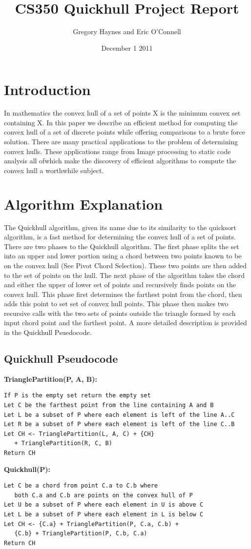 \documentclass[11pt]{article}
\title{CS350 Quickhull Project Report}
\author{Gregory Haynes and Eric O'Connell}
\date{December 1 2011}
\begin{document}
\maketitle

\section{Introduction}

In mathematics the convex hull of a set of points X is the minimum convex set containing X\cite{Wikipedia:QH}. In this paper we describe an efficient method for computing the convex hull of a set of discrete points while offering comparisons to a brute force solution. There are many practical applications to the problem of determining convex hulls. These applications range from Image processing to static code analysis all ofwhich make the discovery of efficient algorithms to compute the convex hull a worthwhile subject.

\section{Algorithm Explanation}

The Quickhull algorithm, given its name due to its similarity to the quicksort algorithm, is a fast method for determining the convex hull of a set of points. There are two phases to the Quickhull algorithm. The first phase splits the set into an upper and lower portion using a chord between two points known to be on the convex hull (See Pivot Chord Selection). These two points are then added to the set of points on the hull. The next phase of the algorithm takes the chord and either the upper of lower set of points and recursively finds points on the convex hull. This phase first determines the farthest point from the chord, then adds this point to set set of convex hull points. This phase then makes two recursive calls with the two sets of points outside the triangle formed by each input chord point and the farthest point. A more detailed description is provided in the Quickhull Psuedocode.

\subsection{Quickhull Pseudocode}

\textbf{TrianglePartition(P, A, B):}
\begin{verbatim}
If P is the empty set return the empty set
Let C be the farthest point from the line containing A and B
Let L be a subset of P where each element is left of the line A..C
Let R be a subset of P where each element is left of the line C..B
Let CH <- TrianglePartition(L, A, C) + {CH}
   + TrianglePartition(R, C, B)
Return CH
\end{verbatim}
\textbf{Quickhull(P):}
\begin{verbatim}
Let C be a chord from point C.a to C.b where 
   both C.a and C.b are points on the convex hull of P
Let U be a subset of P where each element in U is above C
Let L be a subset of P where each element in L is below C
Let CH <- {C.a} + TrianglePartition(P, C.a, C.b) + 
   {C.b} + TrianglePartition(P, C.b, C.a)
Return CH
\end{verbatim}
\end{document}
